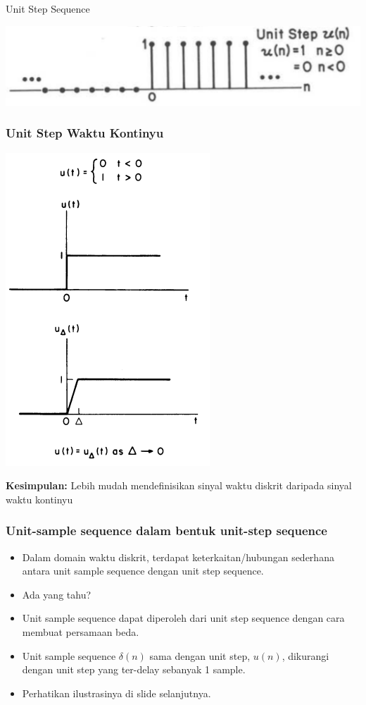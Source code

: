 \documentclass[pdflatex,compress]{beamer}
\begin{document}
\begin{frame}{Unit Step Sequence}
	\begin{center}
		\includegraphics[width=\linewidth]{img/img003}
	\end{center}
\end{frame}

\begin{frame}
	\frametitle{Unit Step Waktu Kontinyu}
	\begin{center}
		\includegraphics[height=0.9\textheight]{img/img006}
	\end{center}
\end{frame}

\begin{frame}
	\textbf{Kesimpulan:} Lebih mudah mendefinisikan sinyal waktu diskrit daripada sinyal waktu kontinyu
\end{frame}

\begin{frame}
	\frametitle{Unit-sample sequence dalam bentuk unit-step sequence}
	\begin{itemize}
		\item<1-> Dalam domain waktu diskrit, terdapat keterkaitan/hubungan sederhana antara unit sample sequence dengan unit step sequence.
		\item<2-> Ada yang tahu?
		\item<3-> Unit sample sequence dapat diperoleh dari unit step sequence dengan cara membuat persamaan beda.
		\item<3-> Unit sample sequence $ \delta (n) $ sama dengan unit step, $ u(n) $, dikurangi dengan unit step yang ter-delay sebanyak 1 sample.
		\item<4-> Perhatikan ilustrasinya di slide selanjutnya.
	\end{itemize}
\end{frame}
\end{document}
